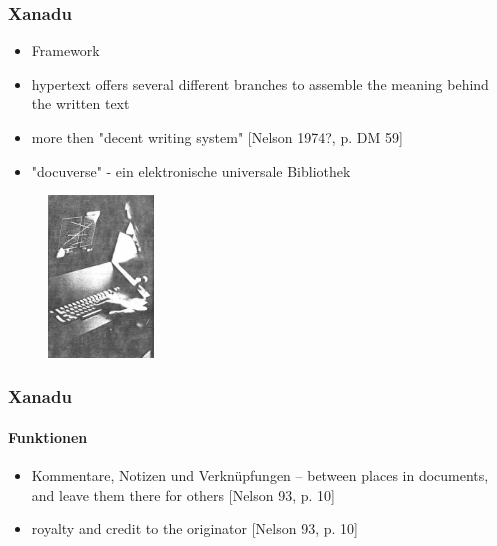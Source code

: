 \begin{frame}
\frametitle{Xanadu}
\begin{itemize}
	\item Framework
	\item hypertext offers several different branches to assemble the meaning behind the written text
	\item more then "decent writing system" [Nelson 1974?, p. DM 59]
	\item "docuverse" - ein elektronische universale Bibliothek
\end{itemize}

\begin{figure}[htbp]
	\centering
	\includegraphics[width=0.25\textwidth]{images/xanadu}
\end{figure}

\end{frame}

\begin{frame}
\frametitle{Xanadu}
\framesubtitle{Funktionen}
\begin{itemize}

	\item Kommentare, Notizen und Verknüpfungen – between places in documents, and leave them there for others [Nelson 93, p. 10]
	\item royalty and credit to the originator [Nelson 93, p. 10]
	

\end{itemize}
\end{frame}
